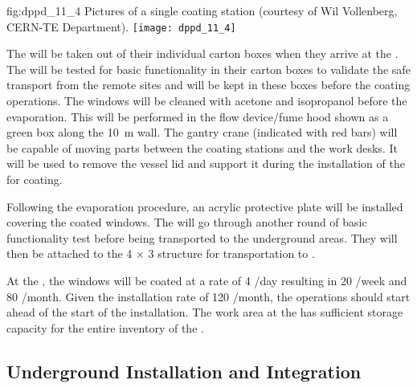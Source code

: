 \begin{dunefigure}{fig:dppd_11_4}
{Pictures of a single  coating station (courtesy of Wil Vollenberg, CERN-TE Department).}
\texttt{[image: dppd\_11\_4]}
\end{dunefigure}

The  will be taken out of their individual carton boxes when they arrive at the . The  will be tested for basic functionality in their carton boxes to validate the safe transport from the remote sites and will be kept in these boxes before the coating operations. The  windows will be cleaned with acetone and isopropanol before the evaporation. This will be performed in the flow device/fume hood shown as a green box along the \SI{10}{\m} wall. The gantry crane (indicated with red bars) will be capable of moving parts between the coating stations and the work desks. It will be used to remove the vessel lid and support it during the installation of the  for coating.

Following the evaporation procedure, an acrylic protective plate will be installed covering the coated  windows.
The  will go through another round of basic functionality test before being transported to the underground areas. They will then be attached to the \num{4} $\times$ \num{3} structure for transportation to \surf.

At the , the  windows will be coated at a rate of \num{4} /day resulting in \num{20} /week and \num{80} /month. Given the installation rate of \num{120} /month, the  operations should start ahead of the start of the installation. The  work area at the  has sufficient storage capacity for the entire  inventory of the . 

\subsection{Underground Installation and Integration}
\label{subsec:dp-pds-undergroundinstallation}

